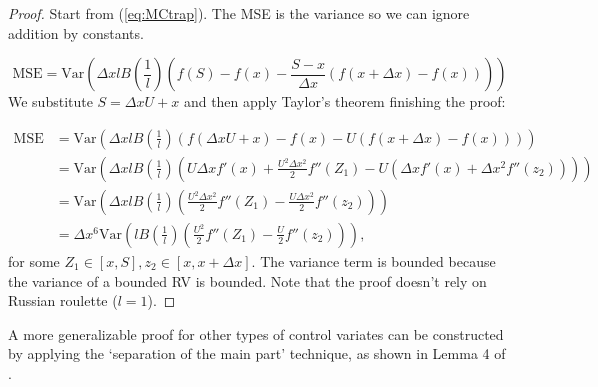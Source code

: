 \documentclass[a4paper,12pt]{article}
\begin{document}
\begin{proof}
  Start from (\ref{eq:MCtrap}). The MSE is the variance
  so we can ignore addition by constants.

  \begin{equation}
    \text{MSE} = \text{Var}\left( \Delta x l B\left( \frac{1}{l}\right)
    \left(f(S) - f(x) - \frac{S - x}{\Delta x}
    \left(f(x+\Delta x) - f(x)\right) \right)\right)
  \end{equation}
  We substitute $S = \Delta x U + x$ and then apply Taylor's theorem
  finishing the proof:

  \begin{align}
    \text{MSE} & = \text{Var}\left( \Delta x l B\left( \frac{1}{l}\right)
    \left(f(\Delta x U+x) - f(x) - U
    \left(f(x+\Delta x) - f(x)\right) \right)\right)                           \\
               & = \text{Var}\left( \Delta x l B\left( \frac{1}{l}\right)
    \left( U \Delta x f'(x)+ \frac{U^{2} \Delta x ^{2}}{2} f''(Z_{1})
    - U \left( \Delta x f'(x) +
    \Delta x ^{2} f''(z_{2})\right) \right)\right)                             \\
               & = \text{Var}\left( \Delta x l B\left( \frac{1}{l}\right)
    \left( \frac{U^{2} \Delta x ^{2}}{2} f''(Z_{1})
    -  \frac{U\Delta x ^{2}}{2} f''(z_{2}) \right)\right)                      \\
               & =\Delta x ^{6} \text{Var}\left(  l B\left( \frac{1}{l}\right)
    \left( \frac{U^{2} }{2} f''(Z_{1})
    -  \frac{U}{2} f''(z_{2}) \right)\right),
  \end{align}
  for some $Z_{1} \in [x,S], z_{2} \in [x,x+\Delta x]$. The variance term is bounded
  because the variance of a bounded RV is bounded.
  Note that the proof doesn't rely on Russian roulette ($l=1$).
\end{proof}

\begin{related}
  A more generalizable proof for other types of control variates can
  be constructed by applying the \enquote*{separation of the main part} technique,
  as shown in Lemma 4 of \cite{heinrich_monte_1993}.
\end{related}
\end{document}
